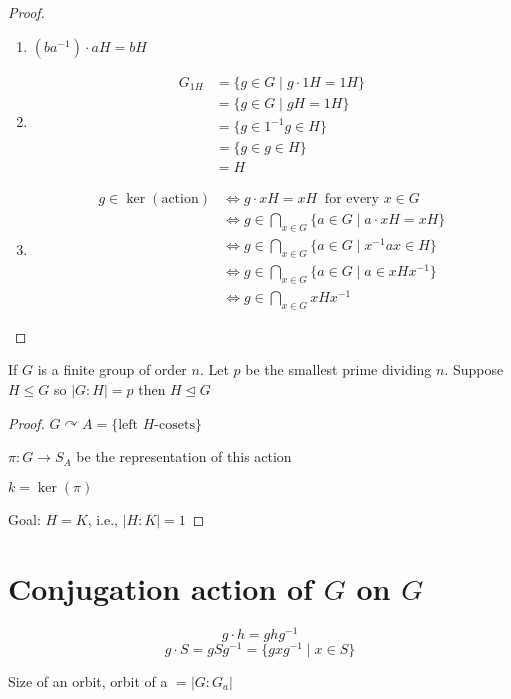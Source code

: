 \begin{proof}
  \begin{enumerate}
    \item $(ba^{-1})\cdot aH = bH$
    \item \begin{align*}
      G_{1H} &= \{g \in G \mid g\cdot 1H = 1H\} \\ 
        &= \{g \in G \mid gH = 1H\} \\
        &= \{g \in 1^{-1}g \in H\} \\
        &= \{g \in g \in H\} \\
        &= H
    \end{align*}
    \item \begin{align*}
      g \in \ker(\text{action}) &\iff g\cdot x H = xH\ \text{ for every } x\in G \\
      &\iff g \in \bigcap_{x \in G} \{a \in G \mid a\cdot xH = xH\} \\
      &\iff g \in \bigcap_{x \in G} \{a \in G \mid x^{-1}a x \in H\} \\
      &\iff g \in \bigcap_{x \in G} \{a \in G \mid a \in xH x^{-1}\} \\
      &\iff g \in \bigcap_{x \in G} xHx^{-1}
    \end{align*}
  \end{enumerate}
\end{proof}

\begin{corollary}
  If $G$ is a finite group of order $n$. Let $p$ be the smallest prime dividing $n$.
  Suppose $H \le G$ so $|G:H| = p$ then $H \trianglelefteq G$
\end{corollary}
\begin{proof}
  $G \curvearrowright A = \{\text{left }H\text{-cosets}\}$ 
  
  $\pi: G \to S_A$ be the representation of this action

  $k = \ker(\pi)$

  Goal: $H = K$, i.e., $|H:K|=1$
\end{proof}

\section{Conjugation action of $G$ on $G$}

\[g\cdot h = ghg^{-1}\]
\[g\cdot S = gSg^{-1} = \{gxg^{-1} \mid x \in S\}\]

Size of an orbit, orbit of a $=|G:G_a|$

